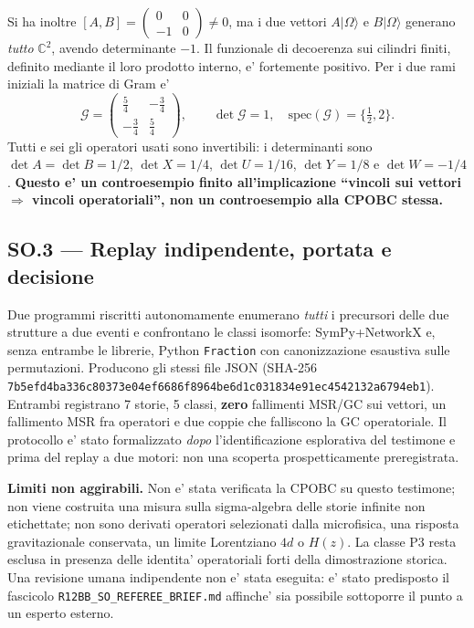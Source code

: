 \documentclass[11pt,a4paper]{article}
\begin{document}
Si ha inoltre $[A,B]=\left(\begin{smallmatrix}0&0\\-1&0\end{smallmatrix}\right)\ne0$, ma i due vettori $A|\Omega\rangle$ e $B|\Omega\rangle$ generano \emph{tutto} $\mathbb C^2$, avendo determinante $-1$. Il funzionale di decoerenza sui cilindri finiti, definito mediante il loro prodotto interno, e' fortemente positivo. Per i due rami iniziali la matrice di Gram e'
\begin{equation}
\mathcal G=\begin{pmatrix}\tfrac54&-\tfrac34\\-\tfrac34&\tfrac54\end{pmatrix},\qquad
\det\mathcal G=1,\quad\mathrm{spec}(\mathcal G)=\{\tfrac12,2\}.\tag{SO.5}
\end{equation}
Tutti e sei gli operatori usati sono invertibili: i determinanti sono $\det A=\det B=1/2$, $\det X=1/4$, $\det U=1/16$, $\det Y=1/8$ e $\det W=-1/4$. \textbf{Questo e' un controesempio finito all'implicazione ``vincoli sui vettori $\Rightarrow$ vincoli operatoriali'', non un controesempio alla CPOBC stessa.}

\subsection*{SO.3 --- Replay indipendente, portata e decisione}
Due programmi riscritti autonomamente enumerano \emph{tutti} i precursori delle due strutture a due eventi e confrontano le classi isomorfe: SymPy+NetworkX e, senza entrambe le librerie, Python \texttt{Fraction} con canonizzazione esaustiva sulle permutazioni. Producono gli stessi file JSON (SHA-256 \texttt{7b5efd4ba336c80373e04ef6686f8964be6d1c031834e91ec4542132a6794eb1}). Entrambi registrano 7 storie, 5 classi, \textbf{zero} fallimenti MSR/GC sui vettori, un fallimento MSR fra operatori e due coppie che falliscono la GC operatoriale. Il protocollo e' stato formalizzato \emph{dopo} l'identificazione esplorativa del testimone e prima del replay a due motori: non una scoperta prospetticamente preregistrata.

\textbf{Limiti non aggirabili.} Non e' stata verificata la CPOBC su questo testimone; non viene costruita una misura sulla sigma-algebra delle storie infinite non etichettate; non sono derivati operatori selezionati dalla microfisica, una risposta gravitazionale conservata, un limite Lorentziano $4d$ o $H(z)$. La classe P3 resta esclusa in presenza delle identita' operatoriali forti della dimostrazione storica. Una revisione umana indipendente non e' stata eseguita: e' stato predisposto il fascicolo \texttt{R12BB\_SO\_REFEREE\_BRIEF.md} affinche' sia possibile sottoporre il punto a un esperto esterno.
\end{document}
